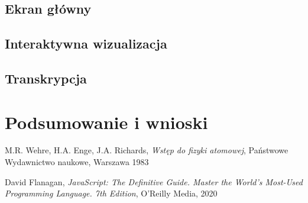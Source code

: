\documentclass{SGGW-thesis}
\begin{document}
	\section{Ekran główny}
	\section{Interaktywna wizualizacja}
	\section{Transkrypcja}
	
\chapter{Podsumowanie i wnioski}


\begin{thebibliography}{9}
	M.R. Wehre, H.A. Enge, J.A. Richards,
	\textit{Wstęp do fizyki atomowej}, 
	Państwowe Wydawnictwo naukowe, Warszawa 1983
	
	David Flanagan, 
	\textit{JavaScript: The Definitive Guide. Master the World's Most-Used Programming Language. 7th Edition}, 
	O'Reilly Media, 2020
	
	
\end{thebibliography}

\beforelastpage
\end{document}
